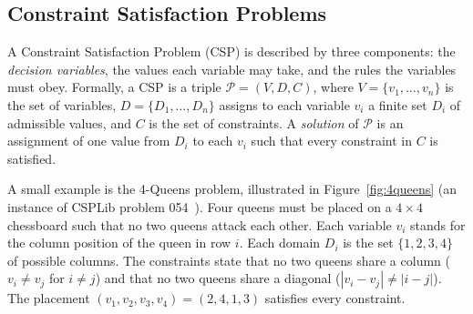 \documentclass[11pt,a4paper]{article}
\begin{document}
\subsection{Constraint Satisfaction Problems}\label{sec:bg:csp}
A Constraint Satisfaction Problem (CSP) is described by three components: the \emph{decision variables}, the values each variable may take, and the rules the variables must obey. Formally, a CSP is a triple $\mathcal{P} = (V, D, C)$, where $V = \{v_1, \dots, v_n\}$ is the set of variables, $D = \{D_1, \dots, D_n\}$ assigns to each variable $v_i$ a finite set $D_i$ of admissible values, and $C$ is the set of constraints. A \emph{solution} of $\mathcal{P}$ is an assignment of one value from $D_i$ to each $v_i$ such that every constraint in $C$ is satisfied.

A small example is the 4-Queens problem, illustrated in Figure~\ref{fig:4queens} (an instance of CSPLib problem 054~\cite{R2}). Four queens must be placed on a $4 \times 4$ chessboard such that no two queens attack each other. Each variable $v_i$ stands for the column position of the queen in row $i$. Each domain $D_i$ is the set $\{1, 2, 3, 4\}$ of possible columns. The constraints state that no two queens share a column ($v_i \neq v_j$ for $i \neq j$) and that no two queens share a diagonal ($|v_i - v_j| \neq |i - j|$). The placement $(v_1, v_2, v_3, v_4) = (2, 4, 1, 3)$ satisfies every constraint.
\end{document}
